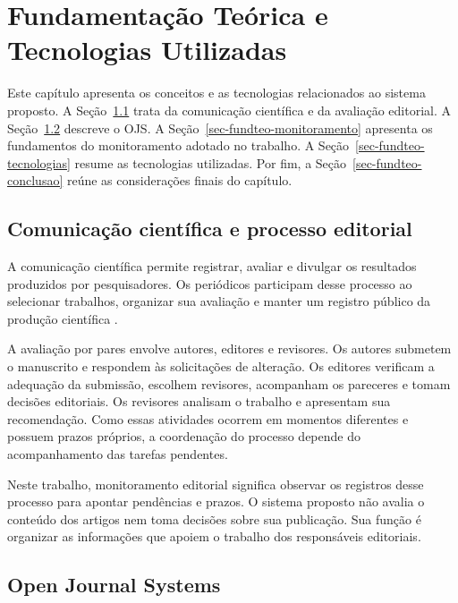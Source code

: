 \chapter{Fundamentação Teórica e Tecnologias Utilizadas}
\label{sec-fundteo}

Este capítulo apresenta os conceitos e as tecnologias relacionados ao sistema proposto. A Seção~\ref{sec-fundteo-comunicacao} trata da comunicação científica e da avaliação editorial. A Seção~\ref{sec-fundteo-ojs} descreve o OJS. A Seção~\ref{sec-fundteo-monitoramento} apresenta os fundamentos do monitoramento adotado no trabalho. A Seção~\ref{sec-fundteo-tecnologias} resume as tecnologias utilizadas. Por fim, a Seção~\ref{sec-fundteo-conclusao} reúne as considerações finais do capítulo.

\section{Comunicação científica e processo editorial}
\label{sec-fundteo-comunicacao}

A comunicação científica permite registrar, avaliar e divulgar os resultados produzidos por pesquisadores. Os periódicos participam desse processo ao selecionar trabalhos, organizar sua avaliação e manter um registro público da produção científica \cite{meadows1999comunicacao,mueller2000periodico}.

A avaliação por pares envolve autores, editores e revisores. Os autores submetem o manuscrito e respondem às solicitações de alteração. Os editores verificam a adequação da submissão, escolhem revisores, acompanham os pareceres e tomam decisões editoriais. Os revisores analisam o trabalho e apresentam sua recomendação. Como essas atividades ocorrem em momentos diferentes e possuem prazos próprios, a coordenação do processo depende do acompanhamento das tarefas pendentes.

Neste trabalho, monitoramento editorial significa observar os registros desse processo para apontar pendências e prazos. O sistema proposto não avalia o conteúdo dos artigos nem toma decisões sobre sua publicação. Sua função é organizar as informações que apoiem o trabalho dos responsáveis editoriais.

\section{Open Journal Systems}
\label{sec-fundteo-ojs}

